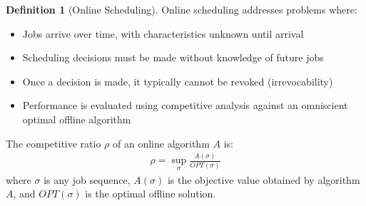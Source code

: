 \documentclass{article}
\theoremstyle{definition}
\newtheorem{definition}{Definition}
\begin{document}
\begin{definition}[Online Scheduling]
Online scheduling addresses problems where:
\begin{itemize}
    \item Jobs arrive over time, with characteristics unknown until arrival
    \item Scheduling decisions must be made without knowledge of future jobs
    \item Once a decision is made, it typically cannot be revoked (irrevocability)
    \item Performance is evaluated using competitive analysis against an omniscient optimal offline algorithm
\end{itemize}

The competitive ratio $\rho$ of an online algorithm $A$ is:
\begin{align}
\rho = \sup_{\sigma} \frac{A(\sigma)}{OPT(\sigma)}
\end{align}
where $\sigma$ is any job sequence, $A(\sigma)$ is the objective value obtained by algorithm $A$, and $OPT(\sigma)$ is the optimal offline solution.
\end{definition}
\end{document}
